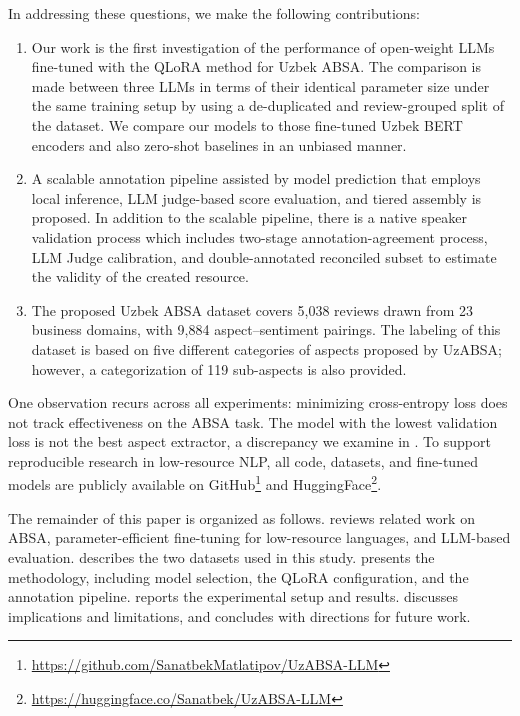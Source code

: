 \documentclass[bdcc,article,submit,moreauthors]{Definitions/mdpi}
\begin{document}
\noindent In addressing these questions, we make the following contributions:

\begin{enumerate}
\item Our work is the first investigation of the performance of open-weight LLMs fine-tuned with the QLoRA method for Uzbek ABSA. The comparison is made between three LLMs in terms of their identical parameter size under the same training setup by using a de-duplicated and review-grouped split of the dataset. We compare our models to those fine-tuned Uzbek BERT encoders and also zero-shot baselines in an unbiased manner.

\item A scalable annotation pipeline assisted by model prediction that employs local inference, LLM judge-based score evaluation, and tiered assembly is proposed. In addition to the scalable pipeline, there is a native speaker validation process which includes two-stage annotation-agreement process, LLM Judge calibration, and double-annotated reconciled subset to estimate the validity of the created resource.

\item The proposed Uzbek ABSA dataset covers 5{,}038 reviews drawn from 23 business domains, with 9{,}884 aspect--sentiment pairings. The labeling of this dataset is based on five different categories of aspects proposed by UzABSA; however, a categorization of 119 sub-aspects is also provided.
\end{enumerate}

\noindent One observation recurs across all experiments: minimizing cross-entropy loss does not track effectiveness on the ABSA task. The model with the lowest validation loss is not the best aspect extractor, a discrepancy we examine in .
 To support reproducible research in low-resource NLP, all code, datasets, and fine-tuned models are publicly available on GitHub\footnote{\url{https://github.com/SanatbekMatlatipov/UzABSA-LLM}} and HuggingFace\footnote{\url{https://huggingface.co/Sanatbek/UzABSA-LLM}}.


The remainder of this paper is organized as follows.  reviews related work on ABSA, parameter-efficient fine-tuning for low-resource languages, and LLM-based evaluation.  describes the two datasets used in this study.  presents the methodology, including model selection, the QLoRA configuration, and the annotation pipeline.  reports the experimental setup and results.  discusses implications and limitations, and  concludes with directions for future work.
\end{document}
